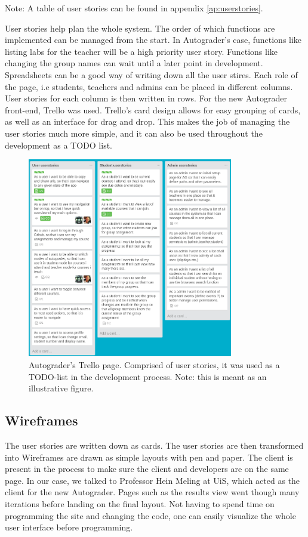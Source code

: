 Note: A table of user stories can be found in appendix \ref{ap:userstories}.

User stories help plan the whole system. The order of which functions are implemented can be managed from the start. In Autograder's case, functions like listing labs for the teacher will be a high priority user story. Functions like changing the group names can wait until a later point in development. Spreadsheets can be a good way of writing down all the user stires. Each role of the page, i.e students, teachers and admins can be placed in different columns. User stories for each column is then written in rows. For the new Autograder front-end, Trello was used. Trello's card design allows for easy grouping of cards, as well as an interface for drag and drop. This makes the job of managing the user stories much more simple, and it can also be used throughout the development as a TODO list.

\begin{figure}[h]
    \centering
    \includegraphics[width=0.8\textwidth]{./graphics/trello.png}
    \caption{Autograder's Trello page. Comprised of user stories, it was used as a TODO-list in the development process. Note: this is meant as an illustrative figure.}
    \label{fig:View of the trello page we used in the development process}
\end{figure}

\subsection{Wireframes}
The user stories are written down as cards. The user stories are then transformed into Wireframes are drawn as simple layouts with pen and paper. The client is present in the process to make sure the client and developers are on the same page. In our case, we talked to Professor Hein Meling at UiS, which acted as the client for the new Autograder. Pages such as the results view  went though many iterations before landing on the final layout. Not having to spend time on programming the site and changing the code, one can easily visualize the whole user interface before programming.

